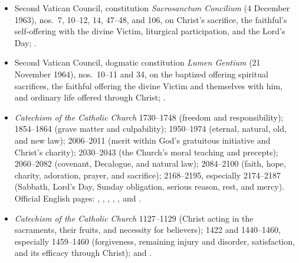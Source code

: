 {\fontsize{8.6}{9.6}\selectfont
\begin{itemize}[itemsep=0pt,parsep=0pt,topsep=0.05em]
\item Second Vatican Council, constitution \emph{Sacrosanctum Concilium} (4 December 1963), nos.~7, 10--12, 14, 47--48, and 106, on Christ's sacrifice, the faithful's self-offering with the divine Victim, liturgical participation, and the Lord's Day; .
\item Second Vatican Council, dogmatic constitution \emph{Lumen Gentium} (21 November 1964), nos.~10--11 and 34, on the baptized offering spiritual sacrifices, the faithful offering the divine Victim and themselves with him, and ordinary life offered through Christ; .
\item \emph{Catechism of the Catholic Church} 1730--1748 (freedom and responsibility); 1854--1864 (grave matter and culpability); 1950--1974 (eternal, natural, old, and new law); 2006--2011 (merit within God's gratuitous initiative and Christ's charity); 2030--2043 (the Church's moral teaching and precepts); 2060--2082 (covenant, Decalogue, and natural law); 2084--2100 (faith, hope, charity, adoration, prayer, and sacrifice); 2168--2195, especially 2174--2187 (Sabbath, Lord's Day, Sunday obligation, serious reason, rest, and mercy). Official English pages: , , , , , and .
\item \emph{Catechism of the Catholic Church} 1127--1129 (Christ acting in the sacraments, their fruits, and necessity for believers); 1422 and 1440--1460, especially 1459--1460 (forgiveness, remaining injury and disorder, satisfaction, and its efficacy through Christ);  and .

\end{itemize}}
